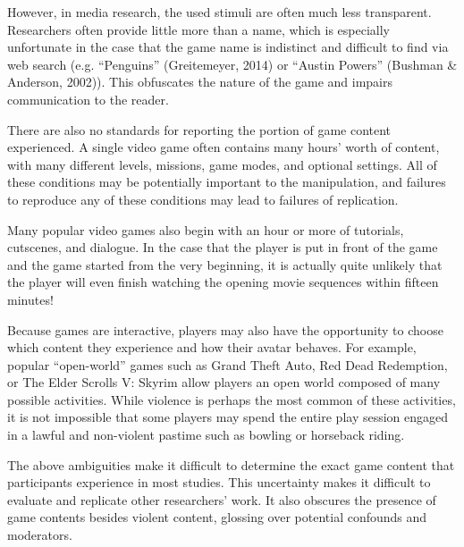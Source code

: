 However, in media research, the used stimuli are often much less transparent. Researchers often provide little more than a name, which is especially unfortunate in the case that the game name is indistinct and difficult to find via web search (e.g. “Penguins” (Greitemeyer, 2014) or “Austin Powers” (Bushman & Anderson, 2002)). This obfuscates the nature of the game and impairs communication to the reader.

There are also no standards for reporting the portion of game content experienced. A single video game often contains many hours’ worth of content, with many different levels, missions, game modes, and optional settings. All of these conditions may be potentially important to the manipulation, and failures to reproduce any of these conditions may lead to failures of replication. 

Many popular video games also begin with an hour or more of tutorials, cutscenes, and dialogue. In the case that the player is put in front of the game and the game started from the very beginning, it is actually quite unlikely that the player will even finish watching the opening movie sequences within fifteen minutes! 

Because games are interactive, players may also have the opportunity to choose which content they experience and how their avatar behaves. For example, popular “open-world” games such as Grand Theft Auto, Red Dead Redemption, or The Elder Scrolls V: Skyrim allow players an open world composed of many possible activities. While violence is perhaps the most common of these activities, it is not impossible that some players may spend the entire play session engaged in a lawful and non-violent pastime such as bowling or horseback riding.

The above ambiguities make it difficult to determine the exact game content that participants experience in most studies. This uncertainty makes it difficult to evaluate and replicate other researchers' work. It also obscures the presence of game contents besides violent content, glossing over potential confounds and moderators.


